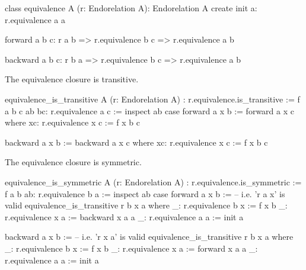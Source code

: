 

\begin{alba}
  class
    equivalence A (r: Endorelation A): Endorelation A
  create
    init a:
     r.equivalence a a

    forward a b c:
      r a b => r.equivalence b c => r.equivalence a b

    backward a b c:
      r b a => r.equivalence b c => r.equivalence a b
\end{alba}


The equivalence closure is transitive.

\begin{alba}
  equivalence_is_transitive
    A (r: Endorelation A)
    : r.equivalence.is_transitive :=
    f a b c ab bc: r.equivalence a c :=
      inspect ab case
        forward a x b :=
          forward a x c where
            xc: r.equivalence x c := f x b c

        backward a x b :=
          backward a x c where
            xc: r.equivalence x c := f x b c
\end{alba}

The equivalence closure is symmetric.

\begin{alba}
  equivalence_is_symmetric
    A (r: Endorelation A)
    : r.equivalence.is_symmetric :=
    f a b ab: r.equivalence b a :=
      inspect ab case
        forward a x b :=   -- i.e. 'r a x' is valid
          equivalence_is_transitive r b x a where
            _: r.equivalence b x := f x b
            _: r.equivalence x a := backward x a a
            _: r.equivalence a a := init a

        backward a x b :=  -- i.e. 'r x a' is valid
          equivalence_is_transitive r b x a where
            _: r.equivalence b x := f x b
            _: r.equivalence x a := forward x a a
            _: r.equivalence a a := init a
\end{alba}






